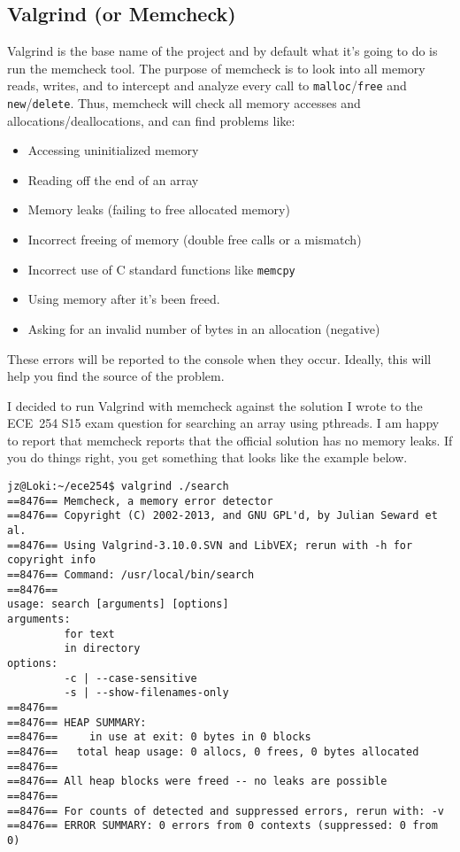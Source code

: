 \subsection*{Valgrind (or Memcheck) }
Valgrind is the base name of the project and by default what it's going to do is run the memcheck tool. The purpose of memcheck is to look into all memory reads, writes, and to intercept and analyze every call to \texttt{malloc}/\texttt{free} and \texttt{new}/\texttt{delete}. Thus, memcheck will check all memory accesses and allocations/deallocations, and can find problems like:
\begin{itemize}
	\item Accessing uninitialized memory
	\item Reading off the end of an array
	\item Memory leaks (failing to free allocated memory)
	\item Incorrect freeing of memory (double free calls or a mismatch)
	\item Incorrect use of C standard functions like \texttt{memcpy}
	\item Using memory after it's been freed.
	\item Asking for an invalid number of bytes in an allocation (negative\textinterrobang)
\end{itemize}

These errors will be reported to the console when they occur. Ideally, this will help you find the source of the problem. 

I decided to run Valgrind with memcheck against the solution I wrote to the ECE~254 S15 exam question for searching an array using pthreads. I am happy to report that memcheck reports that the official solution has no memory leaks. If you do things right, you get something that looks like the example below. 
\begin{lstlisting}
jz@Loki:~/ece254$ valgrind ./search
==8476== Memcheck, a memory error detector
==8476== Copyright (C) 2002-2013, and GNU GPL'd, by Julian Seward et al.
==8476== Using Valgrind-3.10.0.SVN and LibVEX; rerun with -h for copyright info
==8476== Command: /usr/local/bin/search
==8476== 
usage: search [arguments] [options]
arguments:
         for text
         in directory
options:
         -c | --case-sensitive
         -s | --show-filenames-only
==8476== 
==8476== HEAP SUMMARY:
==8476==     in use at exit: 0 bytes in 0 blocks
==8476==   total heap usage: 0 allocs, 0 frees, 0 bytes allocated
==8476== 
==8476== All heap blocks were freed -- no leaks are possible
==8476== 
==8476== For counts of detected and suppressed errors, rerun with: -v
==8476== ERROR SUMMARY: 0 errors from 0 contexts (suppressed: 0 from 0)
\end{lstlisting}

